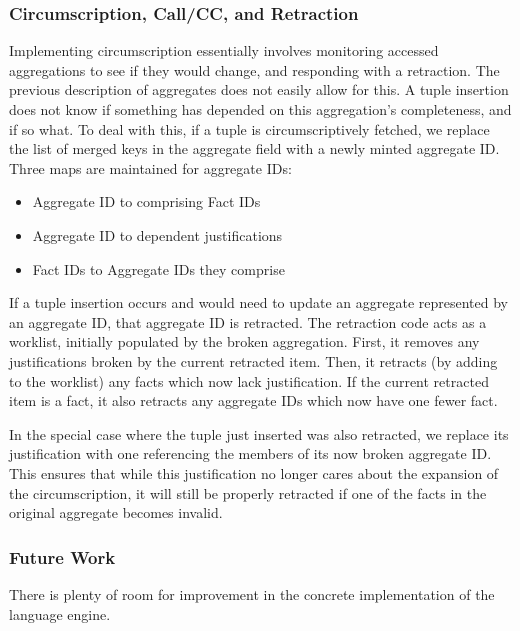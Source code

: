 \subsubsection{Circumscription, Call/CC, and Retraction}
Implementing circumscription essentially involves monitoring accessed aggregations to see if they would change, and responding with a retraction.
The previous description of aggregates does not easily allow for this.
A tuple insertion does not know if something has depended on this aggregation's completeness, and if so what.
To deal with this, if a tuple is circumscriptively fetched, we replace the list of merged keys in the aggregate field with a newly minted aggregate ID.
Three maps are maintained for aggregate IDs:
\begin{itemize}
	\item Aggregate ID to comprising Fact IDs
	\item Aggregate ID to dependent justifications
	\item Fact IDs to Aggregate IDs they comprise
\end{itemize}

If a tuple insertion occurs and would need to update an aggregate represented by an aggregate ID, that aggregate ID is retracted.
The retraction code acts as a worklist, initially populated by the broken aggregation.
First, it removes any justifications broken by the current retracted item.
Then, it retracts (by adding to the worklist) any facts which now lack justification.
If the current retracted item is a fact, it also retracts any aggregate IDs which now have one fewer fact.

In the special case where the tuple just inserted was also retracted, we replace its justification with one referencing the members of its now broken aggregate ID.
This ensures that while this justification no longer cares about the expansion of the circumscription, it will still be properly retracted if one of the facts in the original aggregate becomes invalid.


\subsubsection{Future Work}
There is plenty of room for improvement in the concrete implementation of the language engine.

